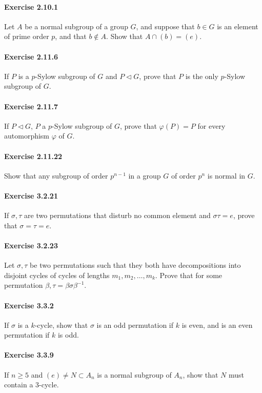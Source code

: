 \documentclass{article}
\begin{document}
\paragraph{Exercise 2.10.1} Let $A$ be a normal subgroup of a group $G$, and suppose that $b \in G$ is an element of prime order $p$, and that $b \not\in A$. Show that $A \cap (b) = (e)$.

\paragraph{Exercise 2.11.6} If $P$ is a $p$-Sylow subgroup of $G$ and $P \triangleleft G$, prove that $P$ is the only $p$-Sylow subgroup of $G$.

\paragraph{Exercise 2.11.7} If $P \triangleleft G$, $P$ a $p$-Sylow subgroup of $G$, prove that $\varphi(P) = P$ for every automorphism $\varphi$ of $G$.

\paragraph{Exercise 2.11.22} Show that any subgroup of order $p^{n-1}$ in a group $G$ of order $p^n$ is normal in $G$.

\paragraph{Exercise 3.2.21} If $\sigma, \tau$ are two permutations that disturb no common element and $\sigma \tau = e$, prove that $\sigma = \tau = e$.

\paragraph{Exercise 3.2.23} Let $\sigma, \tau$ be two permutations such that they both have decompositions into disjoint cycles of cycles of lengths $m_1, m_2, \ldots, m_k$. Prove that for some permutation $\beta, \tau = \beta \sigma \beta^{-1}$.

\paragraph{Exercise 3.3.2} If $\sigma$ is a $k$-cycle, show that $\sigma$ is an odd permutation if $k$ is even, and is an even permutation if $k$ is odd.

\paragraph{Exercise 3.3.9} If $n \geq 5$ and $(e) \neq N \subset A_n$ is a normal subgroup of $A_n$, show that $N$ must contain a 3-cycle.
\end{document}
